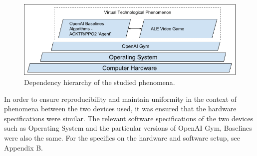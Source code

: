 \begin{figure}
	\includegraphics[width=\columnwidth]{fig5.png} 
	\caption{Dependency hierarchy of the studied phenomena.}
\end{figure}

In order to ensure reproducibility and maintain uniformity in the context of phenomena between the two devices used, it was ensured that the hardware specifications were similar. The relevant software specifications of the two devices such as Operating System and the particular versions of OpenAI Gym, Baselines were also the same. For the specifics on the hardware and software setup, see Appendix B.

